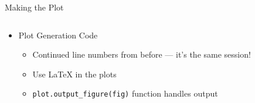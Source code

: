 \documentclass[aspectratio=1609]{presentation}
\begin{document}
\begin{frame}[fragile]{Making the Plot}
  \begin{columns}
    \begin{column}{0.4\textwidth}
      \begin{itemize}
        \item Plot Generation Code
        \begin{itemize}
          \item Continued line numbers from before --- it's the same session!
          \item Use {\LaTeX} in the plots
          \item \texttt{plot.output\_figure(fig)} function handles
            output
        \end{itemize}
      \end{itemize}
    \end{column}
    \begin{column}{0.6\textwidth}
      {\pytypeset}
    \end{column}
  \end{columns}
\end{frame}
\end{document}
